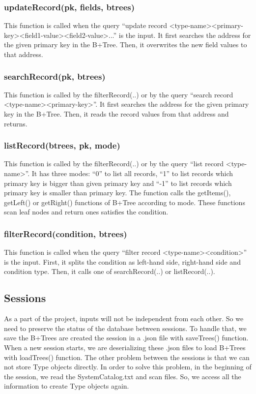 \documentclass{article}
\begin{document}
\subsubsection{updateRecord(pk, fields, btrees)}
This function is called when the query “update record \textless type-name\textgreater \textless primary-key\textgreater \textless field1-value\textgreater \textless field2-value\textgreater...” is the input. It first searches the address for the given primary key in the B+Tree. Then, it overwrites the new field values to that address.

\subsubsection{searchRecord(pk, btrees)}
This function is called by the filterRecord(..) or by the query “search record \textless type-name\textgreater \textless primary-key\textgreater”. It first searches the address for the given primary key in the B+Tree. Then, it reads the record values from that address and returns.

\subsubsection{listRecord(btrees, pk, mode)}
This function is called by the filterRecord(..) or by the query “list record \textless type-name\textgreater”. It has three modes: “0” to list all records, “1” to list records which primary key is bigger than given primary key and “-1” to list records which primary key is smaller than primary key. The function calls the getItems(), getLeft() or getRight() functions of B+Tree according to mode. These functions scan leaf nodes and return ones satisfies the condition. 

\subsubsection{filterRecord(condition, btrees)}
This function is called when the query “filter record \textless type-name\textgreater \textless condition\textgreater” is the input. First, it splits the condition as left-hand side, right-hand side and condition type. Then, it calls one of searchRecord(..) or listRecord(..).

\subsection{Sessions}
\label{sessions}
As a part of the project, inputs will not be independent from each other. So we need to preserve the status of the database between sessions. To handle that, we save the B+Trees are created the session in a .json file with saveTrees() function. When a new session starts, we are deserializing these .json files to load B+Trees with loadTrees() function. The other problem between the sessions is that we can not store Type objects directly. In order to solve this problem, in the beginning of the session, we read the SystemCatalog.txt and scan files. So, we access all the information to create Type objects again.  
\end{document}
